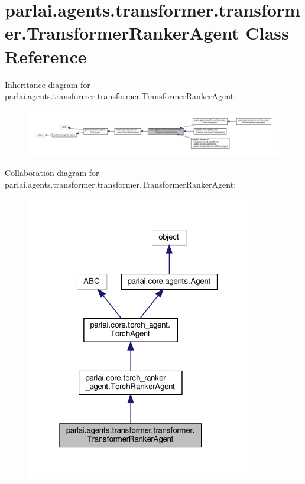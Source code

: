 \hypertarget{classparlai_1_1agents_1_1transformer_1_1transformer_1_1TransformerRankerAgent}{}\section{parlai.\+agents.\+transformer.\+transformer.\+Transformer\+Ranker\+Agent Class Reference}
\label{classparlai_1_1agents_1_1transformer_1_1transformer_1_1TransformerRankerAgent}


Inheritance diagram for parlai.\+agents.\+transformer.\+transformer.\+Transformer\+Ranker\+Agent\+:\nopagebreak
\begin{figure}[H]
\begin{center}
\leavevmode
\includegraphics[width=350pt]{df/d72/classparlai_1_1agents_1_1transformer_1_1transformer_1_1TransformerRankerAgent__inherit__graph}
\end{center}
\end{figure}


Collaboration diagram for parlai.\+agents.\+transformer.\+transformer.\+Transformer\+Ranker\+Agent\+:
\nopagebreak
\begin{figure}[H]
\begin{center}
\leavevmode
\includegraphics[width=280pt]{d4/d3a/classparlai_1_1agents_1_1transformer_1_1transformer_1_1TransformerRankerAgent__coll__graph}
\end{center}
\end{figure}
